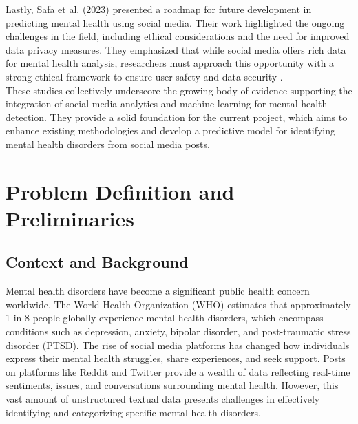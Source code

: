 \noindent
Lastly, Safa et al. (2023) presented a roadmap for future development in predicting mental health using social media. Their work highlighted the ongoing challenges in the field, including ethical considerations and the need for improved data privacy measures. They emphasized that while social media offers rich data for mental health analysis, researchers must approach this opportunity with a strong ethical framework to ensure user safety and data security \cite{safa2023predictingmentalhealthusing}. \\

\noindent
These studies collectively underscore the growing body of evidence supporting the integration of social media analytics and machine learning for mental health detection. They provide a solid foundation for the current project, which aims to enhance existing methodologies and develop a predictive model for identifying mental health disorders from social media posts.





\section{Problem Definition and Preliminaries}

\subsection{Context and Background}
\noindent
Mental health disorders have become a significant public health concern worldwide. The World Health Organization (WHO) estimates that approximately 1 in 8 people globally experience mental health disorders, which encompass conditions such as depression, anxiety, bipolar disorder, and post-traumatic stress disorder (PTSD). The rise of social media platforms has changed how individuals express their mental health struggles, share experiences, and seek support. Posts on platforms like Reddit and Twitter provide a wealth of data reflecting real-time sentiments, issues, and conversations surrounding mental health. However, this vast amount of unstructured textual data presents challenges in effectively identifying and categorizing specific mental health disorders.

